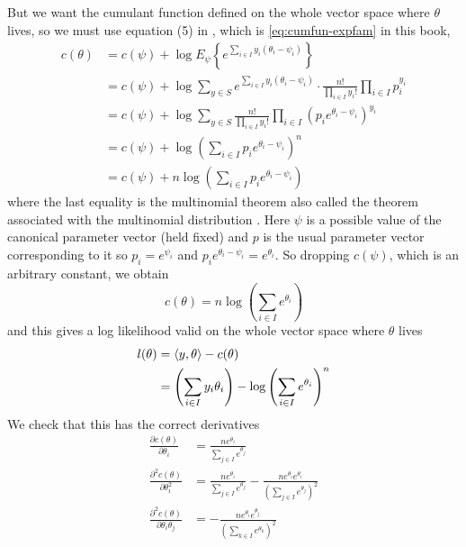 But we want the cumulant function defined on the whole vector space where
$\theta$ lives, so we must use equation (5) in \citet{geyer-gdor},
which is \eqref{eq:cumfun-expfam} in this book,
\begin{align*}
   c(\theta)
   & =
   c(\psi)
   +
   \log E_\psi\left\{ e^{\sum_{i \in I} y_i (\theta_i - \psi_i)} \right\}
   \\
   & =
   c(\psi) + \log \sum_{y \in S}
   e^{\sum_{i \in I} y_i (\theta_i - \psi_i)}
   \cdot
   \frac{n !}{\prod_{i \in I} y_i!} \prod_{i \in I} p_i^{y_i}
   \\
   & =
   c(\psi) + \log \sum_{y \in S}
   \frac{n !}{\prod_{i \in I} y_i!}
   \prod_{i \in I} (p_i e^{\theta_i - \psi_i})^{y_i}
   \\
   & =
   c(\psi) + \log \left( \sum_{i \in I} p_i e^{\theta_i - \psi_i} \right)^n
   \\
   & =
   c(\psi) + n \log \left( \sum_{i \in I} p_i e^{\theta_i - \psi_i} \right)
\end{align*}
where the last equality is the multinomial theorem also called the theorem
associated with the multinomial distribution \citep{brand-name-distributions}.
Here $\psi$ is a possible value of the canonical parameter vector (held fixed)
and $p$ is the usual parameter vector corresponding to it so $p_i = e^{\psi_i}$
and $p_i e^{\theta_i - \psi_i} = e^{\theta_i}$.  So dropping $c(\psi)$,
which is an arbitrary constant, we obtain
\begin{equation} \label{eq:multinomial-cumfun}
   c(\theta) = n \log \left( \sum_{i \in I} e^{\theta_i} \right)
\end{equation}
and this gives a log likelihood valid on the whole vector space where
$\theta$ lives
\begin{equation} \label{eq:multinomial-logl}
\begin{split}
   l(\theta) & = \langle y, \theta \rangle - c(\theta)
   \\
   & = \left( \sum_{i \in I} y_i \theta_i \right)
   - \log \left( \sum_{i \in I} e^{\theta_i} \right)^n
\end{split}
\end{equation}
We check that this has the correct derivatives
\begin{subequations}
\begin{align}
   \frac{\partial c(\theta)}{\partial \theta_i}
   & = 
   \frac{n e^{\theta_i}}{\sum_{j \in I} e^{\theta_j}}
   \label{eq:multinomial-cumfun-first-derivatives}
   \\
   \frac{\partial^2 c(\theta)}{\partial \theta_i^2}
   & = 
   \frac{n e^{\theta_i}}{\sum_{j \in I} e^{\theta_j}}
   -
   \frac{n e^{\theta_i} e^{\theta_i}}
   {\left( \sum_{j \in I} e^{\theta_j} \right)^2}
   \label{eq:multinomial-cumfun-second-derivatives-diagonal}
   \\
   \frac{\partial^2 c(\theta)}{\partial \theta_i \theta_j}
   & = 
   -
   \frac{n e^{\theta_i} e^{\theta_j}}
   {\left( \sum_{k \in I} e^{\theta_k} \right)^2}
   \label{eq:multinomial-cumfun-second-derivatives-off-diagonal}
\end{align}
\end{subequations}
